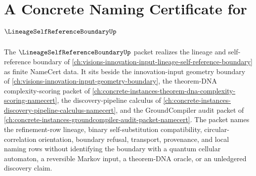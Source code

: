 \chapter{A Concrete Naming Certificate for $\LineageSelfReferenceBoundaryUp$}
\label{ch:concrete-instances-lineage-self-reference-boundary-namecert}

The $\LineageSelfReferenceBoundaryUp$ packet realizes the lineage and self-reference boundary of \autoref{ch:visions-innovation-input-lineage-self-reference-boundary} as finite NameCert data. It sits beside the innovation-input geometry boundary of \autoref{ch:visions-innovation-input-geometry-boundary}, the theorem-DNA complexity-scoring packet of \autoref{ch:concrete-instances-theorem-dna-complexity-scoring-namecert}, the discovery-pipeline calculus of \autoref{ch:concrete-instances-discovery-pipeline-calculus-namecert}, and the GroundCompiler audit packet of \autoref{ch:concrete-instances-groundcompiler-audit-packet-namecert}. The packet names the refinement-row lineage, binary self-substitution compatibility, circular-correlation orientation, boundary refusal, transport, provenance, and local naming rows without identifying the boundary with a quantum cellular automaton, a reversible Markov input, a theorem-DNA oracle, or an unledgered discovery claim.

